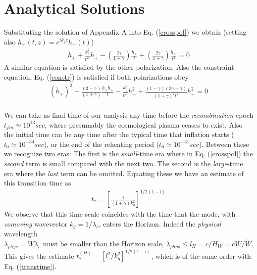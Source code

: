 \documentclass[prd,twocolumn,showpacs,preprintnumbers,amsmath,amssy mb]{revtex4}
\newcommand{\bea}{\begin{eqnarray}}
\newcommand{\eea}{\end{eqnarray}}
\newcommand{\nn}{\nonumber}
\begin{document}
\section{Analytical Solutions}
Substituting the solution of Appendix A into Eq. (\ref{crosspol}) we 
obtain (setting also $h_{+}(t,z)=e^{ik_{g}z}h_{+}(t)$)
\bea 
\label{fulleq}
\ddot{h}_{+}+\frac{k_{g}^{2}}{t^{2l}}h_{+}-
\left(\frac{2\gamma }{1+\gamma }\right)\frac{\dot{h}_{+}}{t}+
\left(\frac{2\gamma }{1+\gamma }\right)\frac{h_{+}}{t^{2}}=0
\eea
A 
similar equation is satisfied by the other polarization. Also 
the constraint equation, Eq. (\ref{constr}) is satisfied if 
both polarizations obey 
\bea 
\label{constr1}
(\dot{h}_{+})^{2}-\frac{(3-\gamma )}{(1+\gamma )}
\frac{h_{+}\dot{h}_{+}}{t}-\frac{k_{g}^{2}}{t^{2l}}
h_{+}^{2}+
\frac{(1-\gamma )(3\gamma -1)}{(1+\gamma )^{2}t^{2}}
h_{+}^{2}=0\nn \\
\eea

We can take as final time of our analysis any time before 
the {\it recombination} epoch 
$t_{fin}\simeq 10^{13}sec$, where presumably the cosmological plasma 
ceases to exist. Also the initial time can be 
any time after the typical time that 
inflation starts ($t_{0}\simeq 10^{-34}sec$), or the end of the reheating 
period ($t_{0}\simeq 10^{-31}sec$). Between these we recognize two eras:  
The first is the {\it small}-time era where in Eq. (\ref{crosspol}) the 
{\it second} term is small compared with the next two. The second is the 
{\it large}-time era where the {\it last} term can be omitted. Equating these 
we have an estimate of this transition time as 
\bea 
\label{transtime}
t_{*}=\left[\frac{\gamma }{(1+\gamma )k_{g}^{2}}\right]
^{1/2(1-l)}
\eea
We observe that this time scale coincides with the time that 
the mode, with {\it comoving} wavevector $k_{g}=1/\lambda _{c}$, 
enters the Horizon.  Indeed the {\it physical} wavelength\\ 
$\lambda _{phys}=W\lambda _{c}$ must be smaller than the 
Horizon scale, $\lambda _{phys}\leq l_{H}=c/H_{W}=cW/\dot{W}$. 
This gives the estimate $t_{*}^{(H)}=[l^{2}/k_{g}^{2}]^{1/2(1-l)}$, 
which is of the same order with\\ Eq. (\ref{transtime}). 
\end{document}
